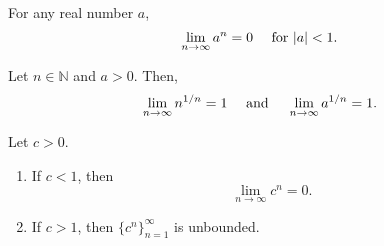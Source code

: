 \documentclass[../main.tex]{subfiles}
\begin{document}
    
    
    
    
    
    
    
    
    
    
    
    
    
    
    
    
    
    
    
    
    
    
    
    
    
    
    
    
    
    \begin{exercise} \label{prp: exponential growth of a sequence}
    For any real number \( a \),
    \[
    \lim_{n \to \infty} a^n = 0 \quad \textnormal{ for } |a| < 1.
    \]
    \end{exercise}
    
    
    
    
    
    
    
    
    
    
    
    
    
    
    
    
    
    
    
    
    
    
    
    
    
    
    
    
    
    
    
    
    
    \begin{exercise} \label{ex: nth root limit}
    Let \(n \in \mathbb{N}\) and \(a > 0\). Then,
    \[
    \lim_{n \to \infty}{n^{1/n}} = 1 \quad \textnormal{ and } \quad \lim_{n \to \infty}{a^{1/n}} = 1.
    \]
    \end{exercise}
    
    
    
    
    
    
    
    
    
    
    
    
    
    \begin{exercise} \label{ex: limit of c^n}
    Let \( c > 0 \).
    \begin{enumerate}
        \item If \( c < 1 \), then
        \[
        \lim_{n \to \infty} c^n = 0.
        \]
        \item If \( c > 1 \), then \( \{c^n\}_{n=1}^{\infty} \) is unbounded.
    \end{enumerate}
    \end{exercise}
    
\end{document}
